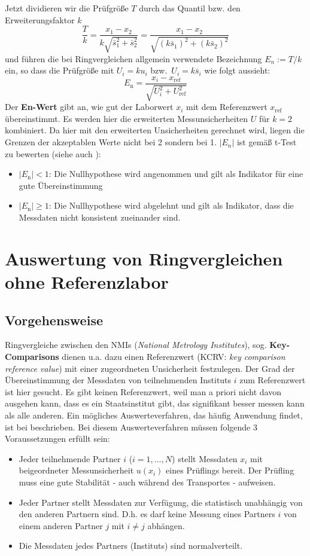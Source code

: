 Jetzt dividieren wir die Prüfgröße $T$ durch das Quantil bzw. den Erweiterungsfaktor $k$
$$
\frac{T}{k} = \frac{x_1 - x_2}{k \sqrt{\bar s_1^2 + \bar s_2^2}}  = \frac{x_1 - x_2}
{\sqrt{(k \bar s_1)^2 + (k \bar s_2)^2}}
$$
und führen die bei Ringvergleichen allgemein verwendete Bezeichnung $E_n := T /k$ ein,
so dass die Prüfgröße mit $U_i = k u_i$ bzw.\  $U_i = k \bar s_i$ wie folgt aussieht:
\begin{equation}
E_\mathrm{n} = \frac{x_{i}- x_\mathrm{ref}}{\sqrt{U_{i}^2+U_\mathrm{ref}^2}}
\label{eq:EnWert}
\end{equation}
Der \textbf{En-Wert} gibt an, wie gut der Laborwert $x_{i}$ mit dem
Referenzwert $x_\mathrm{ref}$ übereinstimmt. Es werden hier die erweiterten Messunsicherheiten $U$ für $k=2$ kombiniert.
Da hier mit den erweiterten Unsicherheiten gerechnet wird, liegen die Grenzen der akzeptablen Werte nicht bei 2 sondern bei 1.
$|E_n|$ ist gemäß t-Test zu bewerten (siehe auch \cite{ISO13528}):
\begin{itemize}
	\item $|E_\mathrm{n}| < 1$: Die Nullhypothese wird angenommen und gilt als Indikator für eine gute Übereinstimmung
	\item $|E_\mathrm{n}| \ge 1$: Die Nullhypothese wird abgelehnt und gilt als Indikator, dass die Messdaten nicht konsistent zueinander sind.
\end{itemize}

\section{Auswertung von Ringvergleichen ohne Referenzlabor}
\subsection{Vorgehensweise}
Ringvergleiche zwischen den NMIs (\textsl{National Metrology Institutes}), sog.
\textbf{Key-Com\-pari\-sons} dienen u.a. dazu einen Referenzwert (KCRV: \textsl{key comparison reference
value}) mit einer zugeordneten Unsicherheit festzulegen.
Der Grad der Übereinstimmung der Messdaten von teilnehmenden Instituts $i$ zum Referenzwert ist hier gesucht. Es gibt keinen Referenzwert, weil man a priori nicht davon ausgehen kann, dass es ein Staatsinstitut gibt, das signifikant besser messen kann als alle anderen.
Ein mögliches Auswerteverfahren, das häufig Anwendung findet, ist bei
\cite{Cox02} beschrieben. Bei diesem Auswerteverfahren müssen
folgende 3 Voraussetzungen erfüllt sein:
\begin{itemize}
	\item Jeder teilnehmende Partner $i$ ($i=1, \dots, N$) stellt Messdaten $x_i$ mit
	beigeordneter Messunsicherheit $u(x_i)$ eines Prüflings bereit. Der
	Prüfling muss eine gute Stabilität - auch während des Transportes -
	aufweisen.
	\item Jeder Partner stellt Messdaten zur Verfügung, die
	statistisch unabhängig von den anderen Partnern sind. D.h. es darf keine
	Messung eines Partners $i$ von einem anderen Partner $j$ mit $i \ne j$ abhängen.
	\item Die Messdaten jedes Partners (Instituts) sind normalverteilt.
\end{itemize}

